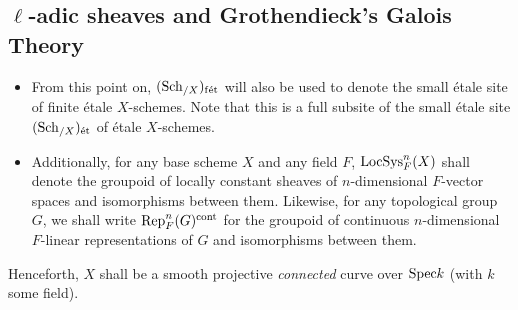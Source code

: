     \subsection{\texorpdfstring{$\ell$}{}-adic sheaves and Grothendieck's Galois Theory}
        \begin{convention}
            \noindent
            \begin{itemize}
                \item From this point on, $(\mathrm{Sch}_{/X})_{\mathrm{f\acute{e}t}}$ will also be used to denote the small \'etale site of finite \'etale $X$-schemes. Note that this is a full subsite of the small \'etale site $(\mathrm{Sch}_{/X})_{\mathrm{\acute{e}t}}$ of \'etale $X$-schemes. 
                \item Additionally, for any base scheme $X$ and any field $F$, $\mathrm{LocSys}^n_F(X)$ shall denote the groupoid of locally constant sheaves of $n$-dimensional $F$-vector spaces and isomorphisms between them. Likewise, for any topological group $G$, we shall write $\mathrm{Rep}_F^n(G)^{\mathrm{cont}}$ for the groupoid of continuous $n$-dimensional $F$-linear representations of $G$ and isomorphisms between them. 
            \end{itemize}
        \end{convention}
        \begin{convention} \label{conv: base_curve}
            Henceforth, $X$ shall be a smooth projective \textit{connected} curve over $\mathrm{Spec} k$ (with $k$ some field).
        \end{convention}
        

